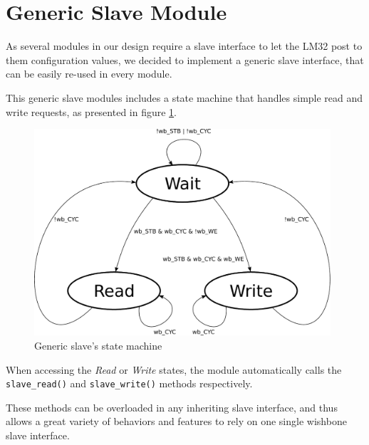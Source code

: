 
\section{Generic Slave Module}

As several modules in our design require a slave interface to let the LM32 post to them configuration values, we decided to implement a generic slave interface, that can be easily re-used in every module.

This generic slave modules includes a state machine that handles simple read and write requests, as presented in figure \ref{state_machine_slave}.

\begin{figure}[h]
\center
\includegraphics[width=11cm]{figs/slave_state_machine.pdf}
\caption{Generic slave's state machine}
\label{state_machine_slave}
\end{figure}

When accessing the \emph{Read} or \emph{Write} states, the module automatically calls the \texttt{slave\_read()} and \texttt{slave\_write()} methods respectively.

These methods can be overloaded in any inheriting slave interface, and thus allows a great variety of behaviors and features to rely on one single wishbone slave interface.
